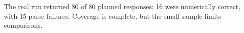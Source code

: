 The real run returned 80 of 80 planned responses; 16 were numerically correct, with 15 parse failures. Coverage is complete, but the small sample limits comparisons.
